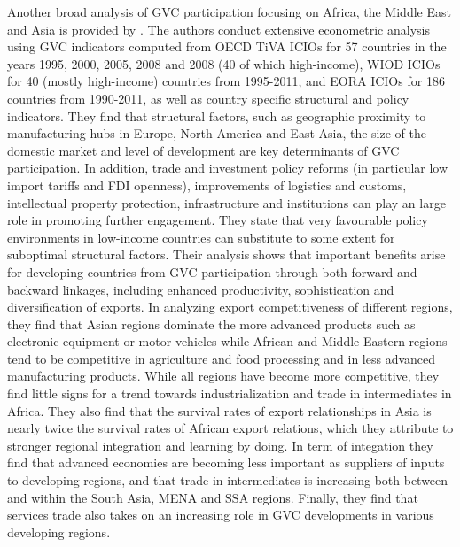\documentclass[a4paper]{article}
\begin{document}
Another broad analysis of GVC participation focusing on Africa, the Middle East and Asia is provided by \citet{kowalski2015participation}. The authors conduct extensive econometric analysis using GVC indicators computed from OECD TiVA ICIOs for 57 countries in the years 1995, 2000, 2005, 2008 and 2008 (40 of which high-income), WIOD ICIOs for 40 (mostly high-income) countries from 1995-2011, and EORA ICIOs for 186 countries from 1990-2011, as well as country specific structural and policy indicators. They find that structural factors, such as geographic proximity to manufacturing hubs in Europe, North America and East Asia, the size of the domestic market and level of development are key determinants of GVC participation. In addition, trade and investment policy reforms (in particular low import tariffs and FDI openness), improvements of logistics and customs, intellectual property protection, infrastructure and institutions can play an large role in promoting further engagement. They state that very favourable policy environments in low-income countries can substitute to some extent for suboptimal structural factors. %
Their analysis shows that important benefits arise for developing countries from GVC participation through both forward and backward linkages, including enhanced productivity, sophistication and diversification of exports. In analyzing export competitiveness of different regions, they find that Asian regions dominate the more advanced products such as electronic equipment or motor vehicles while African and Middle Eastern regions tend to be competitive in agriculture and food processing and in less advanced manufacturing products. %
While all regions have become more competitive, they find little signs for a trend towards industrialization and trade in intermediates in Africa. They also find that the survival rates of export relationships in Asia is nearly twice the survival rates of African export relations, which they attribute to stronger regional integration and learning by doing. In term of integation they find that advanced economies are becoming less important as suppliers of inputs to developing regions, and that trade in intermediates is increasing both between and within the South Asia, MENA and SSA regions. Finally, they find that services trade also takes on an increasing role in GVC developments in various developing regions. \newline 
\end{document}
